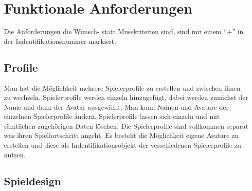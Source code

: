\section{Funktionale Anforderungen}

Die Anforderungen die Wunsch- statt Musskriterien sind, sind mit einem "`+"' in der Indentifikationsnummer markiert.

\subsection{Profile}

\begin{requirements}
	Man hat die Möglichkeit mehrere Spielerprofile zu erstellen und zwischen ihnen zu wechseln.
	 Spielerprofile werden einzeln hinzugefügt, dabei werden zunächst der Name und dann der Avatar ausgewählt.
	 Man kann Namen und Avatare der einzelnen Spielerprofile ändern.
	 Spielerprofile lassen sich einzeln und mit sämtlichen zugehörigen Daten löschen.
	Die Spielerprofile sind vollkommen separat was ihren Spielfortschritt angeht.
	Es besteht die Möglichkeit eigene Avatare zu erstellen und diese als Indentifikationsobjekt der verschiedenen Spielerprofile zu nutzen.
\end{requirements}

\subsection{Spieldesign}

